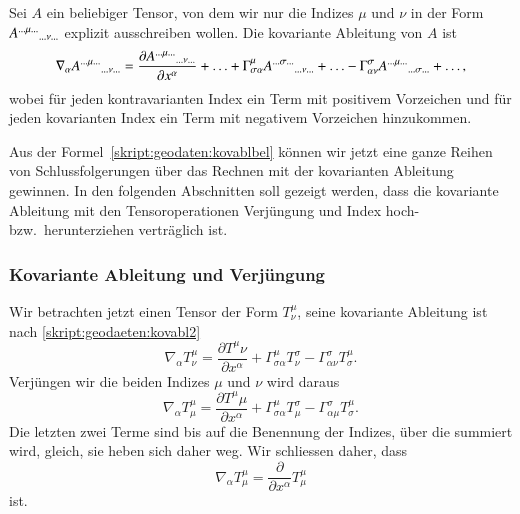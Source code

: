 \begin{definition}
Sei $A$ ein beliebiger Tensor, von dem wir nur die Indizes
$\mu$ und $\nu$ in der Form
$A^{\dots \mu\dots}\mathstrut_{\dots\nu\dots}$
explizit ausschreiben wollen.
Die kovariante Ableitung von $A$ ist
\begin{equation}
\nabla_\alpha A^{\dots \mu\dots}\mathstrut_{\dots\nu\dots}
=
\frac{\partial A^{\dots \mu\dots}\mathstrut_{\dots\nu\dots}}{\partial x^\alpha}
+
\dotsc
+
\Gamma^\mu_{\sigma\alpha}
A^{\dots \sigma\dots}\mathstrut_{\dots\nu\dots}
+
\dotsc
-
\Gamma^\sigma_{\alpha\nu}
A^{\dots \mu\dots}\mathstrut_{\dots\sigma\dots}
+
\dotsc,
\label{skript:geodaten:kovablbel}
\end{equation}
wobei für jeden kontravarianten Index ein Term mit positivem
Vorzeichen und für jeden kovarianten Index ein Term mit negativem
Vorzeichen hinzukommen.
\end{definition}

Aus der Formel~\eqref{skript:geodaten:kovablbel} können wir jetzt eine
ganze Reihen von Schlussfolgerungen über das Rechnen mit der kovarianten
Ableitung gewinnen.
In den folgenden Abschnitten soll gezeigt werden, dass die kovariante
Ableitung mit den Tensoroperationen Verjüngung und Index hoch-
bzw.~herunterziehen verträglich ist.

\subsubsection{Kovariante Ableitung und Verjüngung%
\label{skript:geodaeten:kovablverj}}
Wir betrachten jetzt einen Tensor der Form $T^\mu_\nu$, seine kovariante
Ableitung ist nach \eqref{skript:geodaeten:kovabl2}
\begin{equation}
\nabla_\alpha T^\mu_\nu
=
\frac{\partial T^\mu\nu}{\partial x^\alpha}
+\Gamma^\mu_{\sigma\alpha} T^\sigma_\nu
-\Gamma^\sigma_{\alpha\nu} T^\mu_\sigma.
\end{equation}
Verjüngen wir die beiden Indizes $\mu$ und $\nu$ wird daraus 
\begin{equation}
\nabla_\alpha T^\mu_\mu
=
\frac{\partial T^\mu\mu}{\partial x^\alpha}
+\Gamma^\mu_{\sigma\alpha} T^\sigma_\mu
-\Gamma^\sigma_{\alpha\mu} T^\mu_\sigma.
\label{skript:geodaeten:kovablverj1}
\end{equation}
Die letzten zwei Terme sind bis auf die Benennung der Indizes, über die
summiert wird, gleich, sie heben sich daher weg.
Wir schliessen daher, dass 
\begin{equation}
\nabla_\alpha T^\mu_\mu = \frac{\partial}{\partial x^\alpha}T^\mu_\mu
\label{skript:geodaeten:kovablverj2}
\end{equation}
ist.

